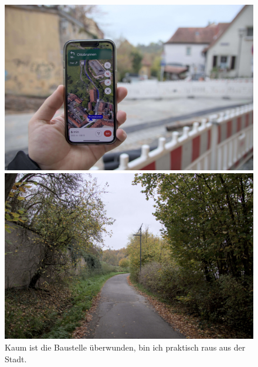 \begin{figure}[h]
    \centering
    \begin{minipage}{.5\textwidth}
        \centering
        \includegraphics[width=.95\linewidth]{figures/geocaching/first/IMG_3093.jpg}
    \end{minipage}%
    \begin{minipage}{.5\textwidth}
        \centering
        \includegraphics[width=.95\linewidth]{figures/geocaching/first/IMG_3095.jpg}
    \end{minipage}
    \caption{Kaum ist die Baustelle überwunden, bin ich praktisch raus aus der Stadt.}
    \label{first-cache-baustelle}
\end{figure}

